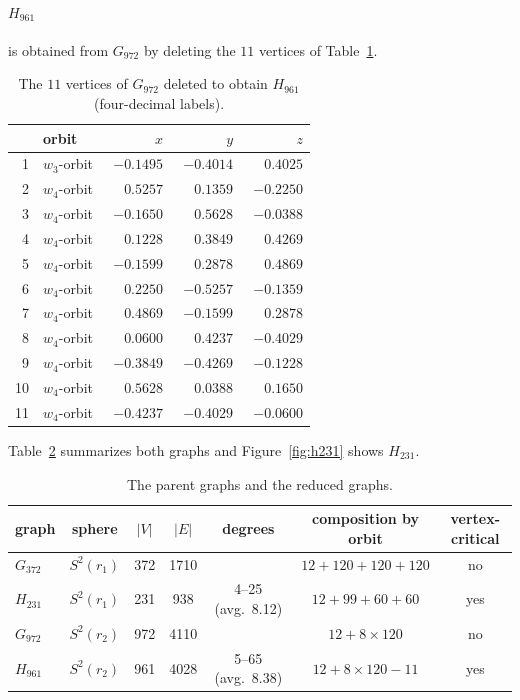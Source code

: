 \documentclass[11pt]{article}
\renewcommand{\_}{\textunderscore\allowbreak}
\theoremstyle{remark}
\begin{document}
\paragraph{$H_{961}$} is obtained from $G_{972}$ by deleting the $11$ vertices of Table~\ref{tab:removed}.

\begin{table}[ht]
\centering\small
\begin{tabular}{rlrrr}
\toprule
 & orbit & $x$ & $y$ & $z$\\
\midrule
1 & $w_3$-orbit & $-0.1495$ & $-0.4014$ & $\phantom{-}0.4025$ \\
2 & $w_4$-orbit & $\phantom{-}0.5257$ & $\phantom{-}0.1359$ & $-0.2250$ \\
3 & $w_4$-orbit & $-0.1650$ & $\phantom{-}0.5628$ & $-0.0388$ \\
4 & $w_4$-orbit & $\phantom{-}0.1228$ & $\phantom{-}0.3849$ & $\phantom{-}0.4269$ \\
5 & $w_4$-orbit & $-0.1599$ & $\phantom{-}0.2878$ & $\phantom{-}0.4869$ \\
6 & $w_4$-orbit & $\phantom{-}0.2250$ & $-0.5257$ & $-0.1359$ \\
7 & $w_4$-orbit & $\phantom{-}0.4869$ & $-0.1599$ & $\phantom{-}0.2878$ \\
8 & $w_4$-orbit & $\phantom{-}0.0600$ & $\phantom{-}0.4237$ & $-0.4029$ \\
9 & $w_4$-orbit & $-0.3849$ & $-0.4269$ & $-0.1228$ \\
10 & $w_4$-orbit & $\phantom{-}0.5628$ & $\phantom{-}0.0388$ & $\phantom{-}0.1650$ \\
11 & $w_4$-orbit & $-0.4237$ & $-0.4029$ & $-0.0600$ \\
\bottomrule
\end{tabular}
\caption{The $11$ vertices of $G_{972}$ deleted to obtain $H_{961}$ (four-decimal labels).}
\label{tab:removed}
\end{table}

Table~\ref{tab:summary} summarizes both graphs and Figure~\ref{fig:h231} shows $H_{231}$.

\begin{table}[ht]
\centering\scriptsize\setlength{\tabcolsep}{2.5pt}
\begin{tabular}{lcccccc}
\toprule
graph & sphere & $|V|$ & $|E|$ & degrees & composition by orbit & vertex-critical \\
\midrule
$G_{372}$~\cite{VND2022} & $S^2(r_1)$ & 372 & 1710 & & $12+120+120+120$ & no \\
$H_{231}$ & $S^2(r_1)$ & 231 & 938 & 4--25 (avg.\ 8.12) & $12+99+60+60$ & yes \\
\midrule
$G_{972}$~\cite{VND2022} & $S^2(r_2)$ & 972 & 4110 & & $12+8\times120$ & no \\
$H_{961}$ & $S^2(r_2)$ & 961 & 4028 & 5--65 (avg.\ 8.38) & $12+8\times120-11$ & yes \\
\bottomrule
\end{tabular}
\caption{The parent graphs and the reduced graphs.}
\label{tab:summary}
\end{table}
\end{document}

